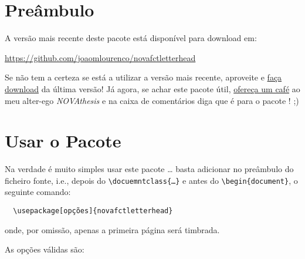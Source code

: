 \documentclass[a4paper,11pt]{article}
\date{\novafctdate\ \ (v.\ \novafctversion)}
\title{\theTitle}
\author{\theAuthor}
\newcommand*{\thePackage}{\texttt{\novafctletterheadname}}
\begin{document}
\maketitle


\begin{abstract}
    Este documento é simultaneamente um manual de instruções e um exemplo de como usar o pacote “\thePackage”.  Este pacote permite produzir documentos em \emph{papel letterhead} da FCT-NOVA.
\end{abstract}


\section{Preâmbulo}

A versão mais recente deste pacote está disponível para download em:

\begin{center}
  \url{https://github.com/joaomlourenco/novafctletterhead}
\end{center}

Se não tem a certeza se está a utilizar a versão mais recente, aproveite e \href{https://github.com/joaomlourenco/novafctletterhead/archive/refs/heads/main.zip}{faça download} da última versão!   Já agora, se achar este pacote útil, \href{https://www.paypal.com/donate/?hosted_button_id=8WA8FRVMB78W8}{ofereça um café} ao meu alter-ego \emph{NOVAthesis} e na caixa de comentários diga que é para o pacote \thePackage! ;)


\section{Usar o Pacote \thePackage}

Na verdade é muito simples usar este pacote \thePackage…  basta adicionar no preâmbulo do ficheiro fonte, i.e., depois do \verb!\docuemntclass{…}! e antes do \verb!\begin{document}!, o seguinte comando:

\begin{verbatim}
  \usepackage[opções]{novafctletterhead}
\end{verbatim}

\noindent onde, por omissão, apenas a primeira página será timbrada.

\medskip
As opções válidas são:\vspace{-1.5ex}
\end{document}
